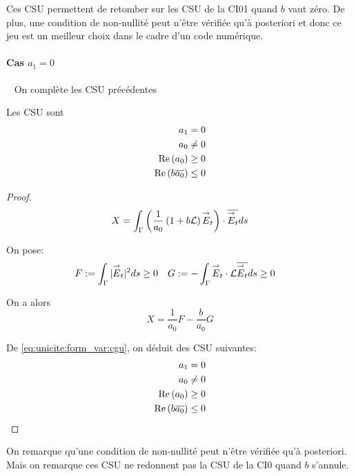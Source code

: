         Ces CSU permettent de retomber sur les CSU de la CI01 quand \(b\) vaut zéro. De plus, une condition de non-nullité peut n'être vérifiée qu'à posteriori et donc ce jeu est un meilleur choix dans le cadre d'un code numérique.
      \paragraph{Cas \(a_1=0\)}
        ~
        On complète les CSU précédentes
        \begin{prop}
          Les CSU sont
          \begin{align}
            a_1 = 0 \\
            a_0 \not= 0\\
            \operatorname{Re}\left(a_0\right) \ge 0\\
            \operatorname{Re}\left(b{\overline{a_0}}\right) \le 0
          \end{align}
        \end{prop}
        \begin{proof}
          \[
            X = \int_\Gamma \left( \dfrac{1}{a_0}\left(1+b\mathcal{L}\right){\overset{\rightarrow}{E}}_t\right) \cdot {\overline{{\overset{\rightarrow}{E}}_t}} ds
          \]

          On pose:
          \begin{align*}
            F&:= \int_\Gamma | {\overset{\rightarrow}{E}}_t | ^2 ds \ge 0 & G &:= -\int_\Gamma {\overset{\rightarrow}{E}}_t \cdot \mathcal{L}{\overline{{\overset{\rightarrow}{E}}_t}} ds \ge 0
          \end{align*}

          On a alors
          \begin{equation}
            \label{eq:unicite:form_var:decomp_cgu_ci1_a1_nul}
            X = \frac{1}{a_0}F - \frac{b}{a_0}G
          \end{equation}

          De \eqref{eq:unicite:form_var:cgu}, on déduit des CSU suivantes:
          \begin{align}
            a_1 = 0 \\
            a_0 \not= 0\\
            \operatorname{Re}\left(a_0\right) \ge 0\\
            \operatorname{Re}\left(b{\overline{a_0}}\right) \le 0
          \end{align}
        \end{proof}

        On remarque qu'une condition de non-nullité peut n'être vérifiée qu'à posteriori. Mais on remarque ces CSU ne redonnent pas la CSU de la CI0 quand \(b\) s’annule.
    
